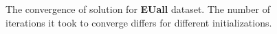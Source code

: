\begin{comment}

\begin{table*}[t]
\centering
\caption{Comparison of \textsc{Rolx} and {\hillclimb} and its variants. Normalized cost of \textsc{Rolx}, {\hillclimb} and {\hillclimb} with \textsc{Rolx} result as initial solution is presented in columns 2-4. \textsc{Hill1} stands for Hill Climbing method and \textsc{Hill2} for Hill Climbing with \textsc{Rolx} result as initial solution. Role sequences of different methods are compared in columns 5-10. \textsc{R} stands for \textsc{Rolx} method result,\textsc{D} for \textsc{deg} method result, \textsc{O} for \textsc{one} method result and \textsc{RD} for \textsc{rnd} method result.}
\begin{tabular}{l r r r r r r r r r r} 
\toprule
&\multicolumn{3}{c}{Normalized Cost}&\multicolumn{6}{c}{Role Differences}\\ \cmidrule{2-4} \cmidrule{6-11}
Name&\textsc{Rolx}&\textsc{Hill1}&\textsc{Hill2}&&\textsc{D}-vs-\textsc{R}&\textsc{O}-vs-\textsc{R}&\textsc{R}-vs-\textsc{RD}&\textsc{D}-vs-\textsc{O}&\textsc{D}-vs-\textsc{RD}&\textsc{O}-vs-\textsc{RD}  \\ 
\midrule
{\karate} &  0.217 & 0.096 & 0.124&&0.44&0.44&0.47&0.44&0.53&0.68 \\
{\dolphins} & 0.458 & 0.252 & 0.302&&0.48&0.55&0.52&0.59&0.61&0.59 \\
{\lesmis} & 0.305 & 0.124 & 0.161&&0.36&0.42&0.34&0.58&0.73&0.57 \\
{\facebook} & 0.285 & 0.043 & 0.056&&0.24&0.33&0.32&0.45&0.44&0.71 \\
{\enron} & 0.467 & 0.019 & 0.019&&0.33&0.31&0.31&0.51&0.43&0.48 \\
{\EUall} & 0.438 & 0.028 & 0.029&&0.35&0.32&0.26&0.46&0.31&0.38  \\
{\dblp} & 0.509 & 0.059 & 0.061&&0.65&0.27&0.25&0.49&0.32&0.23 \\
\bottomrule
\end{tabular}
\label{table:rolx}
\end{table*}
\end{comment}



\iffalse
\begin{figure}
\centering
{}
\caption{The convergence of solution for \textbf{EUall} dataset. The number of iterations it took to converge differs for different initializations.}
\end{figure}

